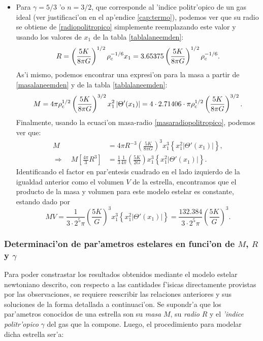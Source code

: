 \begin{itemize}
\item Para $\gamma=5/3$ 'o $n=3/2$, que corresponde al 'indice politr'opico de un gas ideal (ver justificaci'on en el ap'endice \ref{cap:termo}), podemos ver que su radio se obtiene de \eqref{radiopolitropico} simplemente reemplazando este valor y usando los valores de $x_1$ de la tabla \ref{tablalaneemden}:
\begin{equation}\label{radio5/3}
 R=\left(\frac{5K}{8\pi G}\right)^{1/2}\rho_{\rm c}^{-1/6}x_1=3.65375\left(\frac{5K}{8\pi G}\right)^{1/2}\rho_{\rm c}^{-1/6}.
\end{equation}
As'i mismo, podemos encontrar una expresi'on para la masa a partir de \eqref{masalaneemden} y de la tabla \ref{tablalaneemden}:
\begin{equation}\label{masa5/3}
 M=4\pi\rho_{\rm c}^{1/2}\left(\frac{5K}{8\pi G}\right)^{3/2}x_1^2\left|\Theta'(x_1)\right|=4\cdot2.71406\cdot\pi\rho_{\rm c}^{1/2}\left(\frac{5K}{8\pi G}\right)^{3/2}.
\end{equation}
Finalmente, usando la ecuaci'on masa-radio \eqref{masaradiopolitropico}, podemos ver que:
\begin{align}
M&=4\pi R^{-3}\left(\frac{5K}{8\pi G}\right)^3x_1^3\left\{x_1^2\left|\Theta'(x_1)\right|\right\}\label{masaradio5/3},\\
\Rightarrow\quad M\left[\frac{4\pi}{3}R^3\right]&=\frac{1}{3}\frac{1}{4\pi}\left(\frac{5K}{2G}\right)x_1^3\left\{x_1^2\left|\Theta'(x_1)\right|\right\}.
\end{align}
Identificando el factor en par'entesis cuadrado en el lado izquierdo de la igualdad anterior como el volumen $V$ de la estrella, encontramos que el producto de la masa y volumen para este modelo estelar es constante, estando dado por
\begin{equation}
 MV=\frac{1}{3\cdot 2^5\pi}\left(\frac{5K}{G}\right)^3 x_1^ 3\left\{x_1^2\left|\Theta'(x_1)\right|\right\}=\frac{132.384}{3\cdot 2^5\pi}\left(\frac{5K}{G}\right)^3\label{masavolumen5/3}.
\end{equation}

\end{itemize}


\subsubsection{Determinaci'on de par'ametros estelares en funci'on de \texorpdfstring{$M$}{M}, \texorpdfstring{$R$}{R} y \texorpdfstring{$\gamma$}{gamma}}

Para poder constrastar los resultados obtenidos mediante el modelo estelar newtoniano descrito, con respecto a las cantidades f'isicas directamente provistas por las observaciones, se requiere reescribir las relaciones anteriores y sus soluciones de la forma detallada a continuaci'on. Se supondr'a que los par'ametros conocidos de una estrella son su \emph{masa} $M$, su \emph{radio} $R$ y el \emph{'indice politr'opico} $\gamma$ del gas que la compone. Luego, el procedimiento para modelar dicha estrella ser'a:

